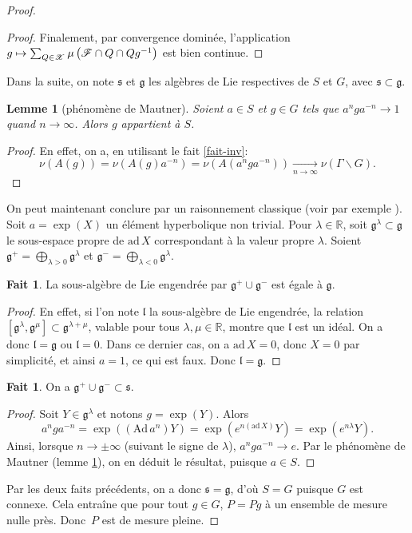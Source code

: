 \documentclass[JEP,XML,SOM,Unicode,francais,published]{cedram}
\newcommand\mto{\mathchoice{\longmapsto}{\mapsto}{\mapsto}{\mapsto}}
\newcommand{\R}{\mathbb{R}}
\newtheorem{lem}[thm]{Lemme}
\theoremstyle{definition}
\newtheorem{fait}[thm]{Fait}
\begin{document}
\begin{proof}
\begin{proof}
Finalement, par convergence dominée, l'application $g \mto \sum_{Q \in \mathscr{X}} \mu\left(\mathscr{F} \cap Q \cap Qg^{-1}\right)$ est bien continue.
\end{proof}

Dans la suite, on note $\mathfrak{s}$ et $\mathfrak{g}$ les algèbres de Lie respectives de $S$ et $G$, avec $\mathfrak{s} \subset \mathfrak{g}$.

\begin{lem}[phénomène de Mautner]
\label{mautner}
Soient $a \in S$ et $g\in G$ tels que $a^nga^{-n} \to 1$ quand $n \to \infty$. Alors $g$ appartient à $S$.
\end{lem}
\begin{proof}
En effet, on a, en utilisant le fait \ref{fait-inv}:
\[\nu(A(g)) = \nu(A(g)a^{-n}) = \nu(A(a^nga^{-n})) \xrightarrow[n \to \infty]{} \nu(\Gamma\backslash G).\]
\end{proof}

On peut maintenant conclure par un raisonnement classique (voir par exemple \hbox{\cite[th.\,1.6.1]{bekka2008kazhdan}}).
Soit $a = \exp(X)$ un élément hyperbolique non trivial. Pour $\lambda\in \R$, soit $\mathfrak{g}^\lambda \subset \mathfrak{g}$ le sous-espace propre de $\mathrm{ad}\,X$ correspondant à la valeur propre $\lambda$. Soient $\mathfrak{g}^{+} = \bigoplus_{\lambda > 0} \mathfrak{g}^\lambda$ et $\mathfrak{g}^{-} = \bigoplus_{\lambda < 0} \mathfrak{g}^\lambda$.

\begin{fait}
La sous-algèbre de Lie engendrée par $\mathfrak{g}^{+} \cup \mathfrak{g}^{-}$ est égale à $\mathfrak{g}$.
\end{fait}
\begin{proof}En effet, si l'on note $\mathfrak{l}$ la sous-algèbre de Lie engendrée, la relation $[\mathfrak{g}^\lambda, \mathfrak{g}^\mu] \subset \mathfrak{g}^{\lambda + \mu}$, valable pour tous $\lambda, \mu \in \R$, montre que $\mathfrak{l}$ est un idéal. On a donc $\mathfrak{l} = \mathfrak{g}$ ou $\mathfrak{l} = 0$. Dans ce dernier cas, on a $\mathrm{ad}\,X = 0$, donc $X = 0$ par simplicité, et ainsi $a = 1$, ce qui est faux. Donc $\mathfrak{l} = \mathfrak{g}$.
\end{proof}

\begin{fait}
On a $\mathfrak{g}^+ \cup \mathfrak{g}^{-} \subset \mathfrak{s}$.
\end{fait}
\begin{proof}
Soit $Y \in \mathfrak{g}^{\lambda}$ et notons $g = \exp(Y)$. Alors \[a^nga^{-n} = \exp((\mathrm{Ad}\,a^n)Y) = \exp(e^{n(\mathrm{ad}\,X)}Y) = \exp(e^{n \lambda}Y).\]
Ainsi, lorsque $n \to \pm\infty$ (suivant le signe de $\lambda$), $a^nga^{-n} \to e$. Par le phénomène de Mautner (lemme \ref{mautner}), on en déduit le résultat, puisque $a \in S$.
\end{proof}
Par les deux faits précédents, on a donc $\mathfrak{s} = \mathfrak{g}$, d'où $S = G$ puisque $G$ est connexe. Cela entraîne que pour tout $g \in G$, $P = Pg$ à un ensemble de mesure nulle près. Donc~$P$ est de mesure pleine.
\end{proof}
\end{document}
